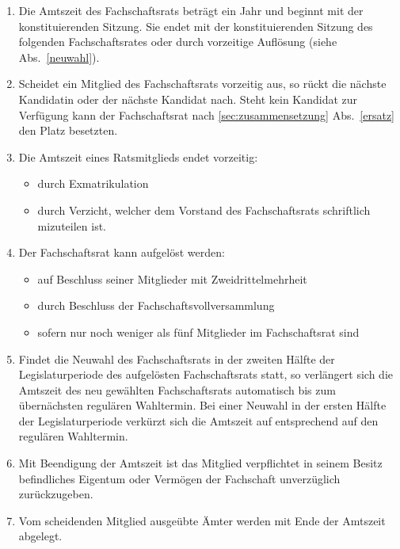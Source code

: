 \begin{enumerate}
\item Die Amtszeit des Fachschaftsrats beträgt ein Jahr und beginnt mit der konstituierenden Sitzung. Sie endet mit der konstituierenden Sitzung des folgenden Fachschaftsrates oder durch vorzeitige Auflösung (siehe Abs.~\ref{neuwahl}).
\item Scheidet ein Mitglied des Fachschaftsrats vorzeitig aus, so rückt die nächste Kandidatin  oder der nächste Kandidat nach. Steht kein Kandidat zur Verfügung kann der Fachschaftsrat nach \ref{sec:zusammensetzung} Abs.~\ref{ersatz} den Platz besetzten.
\item Die Amtszeit eines Ratsmitglieds endet vorzeitig:
\begin{itemize}
\item durch Exmatrikulation
\item durch Verzicht, welcher dem Vorstand des Fachschaftsrats schriftlich mizuteilen ist.
\end{itemize}
\item Der Fachschaftsrat kann aufgelöst werden:
\begin{itemize}
\item auf Beschluss seiner Mitglieder mit Zweidrittelmehrheit
\item durch Beschluss der Fachschaftsvollversammlung
\item sofern nur noch weniger als fünf Mitglieder im Fachschaftsrat sind
\end{itemize}
\item \label{neuwahl} Findet die Neuwahl des Fachschaftsrats in der zweiten Hälfte der Legislaturperiode des aufgelösten Fachschaftsrats statt, so verlängert sich die Amtszeit des neu gewählten Fachschaftsrats automatisch bis zum übernächsten regulären Wahltermin. Bei einer Neuwahl in der ersten Hälfte der Legislaturperiode verkürzt sich die Amtszeit auf entsprechend auf den regulären Wahltermin.
\item Mit Beendigung der Amtszeit ist das Mitglied verpflichtet in seinem Besitz befindliches Eigentum oder Vermögen der Fachschaft unverzüglich zurückzugeben.
\item Vom scheidenden Mitglied ausgeübte Ämter werden mit Ende der Amtszeit abgelegt.
\end{enumerate}

